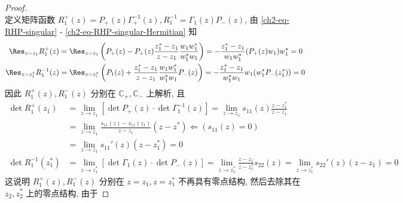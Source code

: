 \begin{proof}
\begin{equation}
    \end{equation}
    定义矩阵函数 $ R_{1}^{+}(z) = P_{+}(z) \Gamma_{+}^{-1}(z), R_{1}^{-1}= \Gamma_{1}(z) P_{-}(z) $, 由 \eqref{ch2-eq-RHP-singular} - \eqref{ch2-eq-RHP-singular-Hermitian} 知
    \begin{equation}
        \begin{aligned}
            \Res_{z = z_1} R_{1}^{+}(z)        & = \Res_{z = z_{1}} \left(P_{+}(z) - P_{+}(z) \frac{z_{1}^{*} - z_{1}}{z - z_{1}} \frac{w_{1}w_{1}^{*}}{w_{1}^{*}w_{1}}\right) = - \frac{z_{1}^{*}-z_{1} }{w_{1}w_{1}^{*}}(P_{+}(z) w_{1}) w_{1}^{*} = 0               \\
            \Res_{z = z_{1}^{*}} R_{1}^{-1}(z) & = \Res_{z = z_{!}^{*}} \left(P_{1}(z) + \frac{z_{1}^{*} - z_{1}}{z - z_{1}} \frac{w_{1}w_{1}^{*}}{w_{1}^{*}w_{1}} P_{-}(z)\right) = - \frac{z_{1}^{*} - z_{1}}{w_{1}^{*}w_{1}} w_{1} (w_{1}^{*} P_{-}(z_{1}^{*})) = 0
        \end{aligned}
    \end{equation}
    因此 $ R_{1}^{+}(z), R_{1}^{-}(z) $ 分别在 $ \mathbb{C_{+}}, \mathbb{C_{-}} $ 上解析, 且
    \begin{equation}
        \begin{aligned}
            \det R_{1}^{+}(z_{1})      & = \lim_{z \to z_{1}} \left[ \det P_{+}(z) \cdot \det \Gamma_{1}^{-1}(z)\right] = \lim_{z \to z_{1}} s_{11}(z) \frac{z - z_{1}^{*}}{z-z_{1}}                                                          \\
                                       & = \lim_{z \to z_{1}} \frac{s_{11}(z) - s_{11}(z_{1})}{z - z_{1}} (z - z^{*}) \Leftarrow (s_{11}(z) = 0)                                                                                              \\
                                       & = \lim_{z \to z_{1}} s_{11}'(z) (z - z_{1}^{*}) = 0                                                                                                                                                  \\
            \det R_{1}^{-1}(z_{1}^{*}) & = \lim_{z \to z_{1}^{*}} \left[ \det \Gamma_{1}(z) \cdot \det P_{-}(z)\right] = \lim_{z \to z_{1}^{*}} \frac{z - z_{1}}{z - z_{1}^{*}} s_{22}(z) = \lim_{z \to z_{1}^{*}} s_{22}'(z) (z - z_{1}) = 0
        \end{aligned}
    \end{equation}
    这说明 $ R_{1}^{+}(z), R_{1}^{-}(z) $ 分别在 $ z = z_{1}, z= z_{1}^{*} $ 不再具有零点结构, 然后去除其在 $ z_{2}, z_{2}^{*} $ 上的零点结构, 由于

\end{proof}
